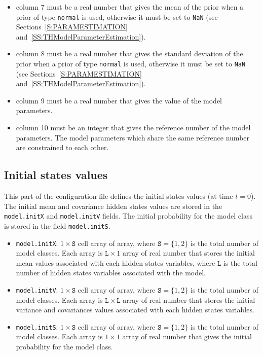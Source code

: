 \begin{itemize}
\item column 7 must be a real number that gives the mean of the prior when a prior of type \lstinline[basicstyle = \mlttfamily \small ]!normal! is used, otherwise it must be set to \lstinline[basicstyle = \mlttfamily \small ]!NaN! (see Sections~\ref{S:PARAMESTIMATION} and~\ref{SS:THModelParameterEstimation}).
\item column 8 must be a real number that gives the standard deviation of the prior when a prior of type \lstinline[basicstyle = \mlttfamily \small ]!normal! is used, otherwise it must be set to \lstinline[basicstyle = \mlttfamily \small ]!NaN! (see Sections~\ref{S:PARAMESTIMATION} and~\ref{SS:THModelParameterEstimation}).
\item column 9 must be a real number that gives the value of the model parameters.
\item column 10 must be an integer that gives the reference number of the model parameters. The model parameters which share the same reference number are constrained to each other.
\end{itemize}

\subsection{Initial states values}
\label{SS:InitialHS}
This part of the configuration file defines the initial states values (at time $t=0$).
The initial mean and covariance hidden states values are stored in the \lstinline[basicstyle = \mlttfamily \small ]!model.initX! and \lstinline[basicstyle = \mlttfamily \small ]!model.initV! fields.
The initial probability for the model class is stored in the field \lstinline[basicstyle = \mlttfamily \small ]!model.initS!.

\begin{itemize}
\item \lstinline[basicstyle = \mlttfamily \small ]!model.initX!: $1\times \mathtt{S}$ cell array of array, where $\mathtt{S} = \{1, 2 \}$ is the total number of model classes.
Each array is $\mathtt{L}\times1$ array of real number that stores the initial mean values associated with each hidden states variables, where $\mathtt{L}$ is the total number of hidden states variables associated with the model.
\item \lstinline[basicstyle = \mlttfamily \small ]!model.initV!: $1\times \mathtt{S}$ cell array of array, where $\mathtt{S} = \{1, 2 \}$ is the total number of model classes.
Each array is $\mathtt{L}\times\mathtt{L}$ array of real number that stores the initial variance and covariances values associated with each hidden states variables.
\item \lstinline[basicstyle = \mlttfamily \small ]!model.initS!: $1\times \mathtt{S}$ cell array of array, where $\mathtt{S} = \{1, 2 \}$ is the total number of model classes. 
Each array is $1\times1$ array of real number that gives the initial probability for the model class.
\end{itemize}

